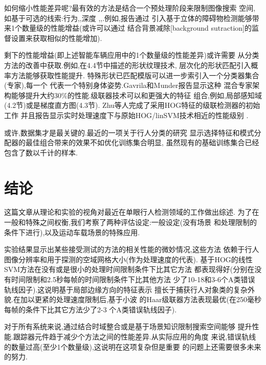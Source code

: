 \documentclass[10pt,letterpaper,journal,compsoc]{IEEEtran}
\begin{document}
如何缩小性能差异呢?最有效的方法是结合一个预处理阶段来限制图像搜索
空间,如基于可选的线索:行为\cite{bib15},\cite{bib56},深度
\cite{bib7},\cite{bib23},\cite{bib81}.例如,\cite{bib23}报告通过
引入基于立体的障碍物检测能够带来1个数量级的性能增益(或许可以通过
结合背景减除[background sutraction]的监督设置来获取相似的性能增加).

剩下的性能增益(即上述智能车辆应用中的1个数量级的性能差异)或许需要
从分类方法的改善中获取.例如,在4.4节中描述的形状纹理技术,
层次化的形状匹配引入概率方法能够获取性能提升\cite{bib22}.
特殊形状已匹配模版可以进一步索引入一个分类器集合(专家),每一个
代表一个特别身体姿势.Gavrila和Munder\cite{bib23}报告显示这种
混合专家架构能够提升大约30\%的性能.级联器技术可以和更强大的特征
组合,例如,局部感知域(4.2节)或是梯度直方图(4.3节).
Zhu等人\cite{bib83}完成了采用HOG特征的级联检测器的初始工作
并且报告显示实时处理速度下与原始HOG/linSVM技术相近的性能级别
\cite{bib11}.

或许,数据集才是最关键的.最近的一项关于行人分类的研究\cite{bib49}
显示选择特征和模式分配器的最佳组合带来的效果不如优化训练集合明显,
虽然现有的基础训练集合已经包含了数以千计的样本\cite{bib49}.
\section{结论}
这篇文章从理论和实验的视角对最近在单眼行人检测领域的工作做出综述.
为了在一般和特殊之间权衡,我们考察了两种评估设定:一般设定(没有场景
和处理限制的条件下进行),以及运动车载场景的特殊应用.

实验结果显示出某些接受测试的方法的相关性能的微妙情况,这些方法
依赖于行人图像分辨率和用于探测的空域网格大小(作为处理速度的代表).
基于HOG的线性SVM方法在没有或是很小的处理时间限制条件下比其它方法
都表现得好(分别在没有时间限制和2.5秒每帧的时间限制条件下比其他方法
少了10-18和3-6个A类错误轨线因子).这说明基于局部边缘方向的特征表示
擅长于捕获行人对象类的复杂外貌.在加以更紧的处理速度限制后,基于小波
的Haar级联器方法表现最优(在250毫秒每帧的条件下比其它方法少了2-3
个A类错误轨线因子).

对于所有系统来说,通过结合时域整合或是基于场景知识限制搜索空间能够
提升性能.跟踪器元件趋于减少个方法之间的性能差异.从实际应用的角度
来说,错误轨线的数量过高(至少1个数量级),这说明在这项复杂但是重要
的问题上还需要很多未来的努力.

\end{document}
